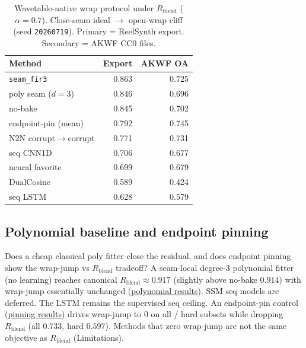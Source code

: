 \begin{table}[t]
  \centering
  \caption{Wavetable-native wrap protocol under $R_{\mathrm{blend}}$ ($\alpha{=}0.7$). Close-seam ideal $\to$ open-wrap cliff (seed \texttt{20260719}). Primary = ReelSynth export. Secondary = AKWF CC0 files.}
  \label{tab:real-wt}
  \setlength{\tabcolsep}{3pt}
  \begin{tabular}{@{}lrr@{}}
    \toprule
    Method & Export & AKWF OA \\
    \midrule
    \texttt{seam\_fir3} & 0.863 & 0.725 \\
    poly seam ($d{=}3$) & 0.846 & 0.696 \\
    no-bake & 0.845 & 0.702 \\
    endpoint-pin (mean) & 0.792 & 0.745 \\
    N2N corrupt$\to$corrupt & 0.771 & 0.731 \\
    seq CNN1D & 0.706 & 0.677 \\
    neural favorite & 0.699 & 0.679 \\
    DualCosine & 0.589 & 0.424 \\
    seq LSTM & 0.628 & 0.579 \\
    \bottomrule
  \end{tabular}
\end{table}

\subsection{Polynomial baseline and endpoint pinning}
\label{sec:poly-jump}

Does a cheap classical poly fitter close the residual, and does endpoint pinning show the wrap-jump vs $R_{\mathrm{blend}}$ tradeoff?
A seam-local degree-3 polynomial fitter (no learning) reaches canonical $R_{\mathrm{blend}}\approx 0.917$ (slightly above no-bake $0.914$) with wrap-jump essentially unchanged (\href{https://github.com/reeldemo/denoise-opt-meta/blob/master/paper/Unsupervised_Wrap-Discontinuity_Repair_in_Wavetable_Synthesis_via_Hybrid_GA-PPO_Meta-Search_v12/figures/poly_baseline.json}{polynomial results}).
SSM seq models are deferred. The LSTM remains the supervised seq ceiling.
An endpoint-pin control (\href{https://github.com/reeldemo/denoise-opt-meta/blob/master/paper/Unsupervised_Wrap-Discontinuity_Repair_in_Wavetable_Synthesis_via_Hybrid_GA-PPO_Meta-Search_v12/figures/jump_control.json}{pinning results}) drives wrap-jump to $0$ on all / hard subsets while dropping $R_{\mathrm{blend}}$ (all $0.733$, hard $0.597$).
Methods that zero wrap-jump are not the same objective as $R_{\mathrm{blend}}$ (Limitations).

